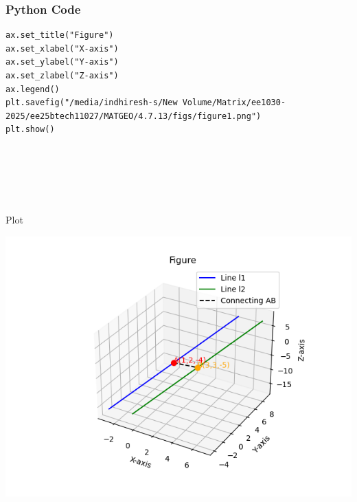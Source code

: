 \documentclass{beamer}
\begin{document}
\begin{frame}[fragile]
    \frametitle{Python Code}

    \begin{lstlisting}
ax.set_title("Figure")
ax.set_xlabel("X-axis")
ax.set_ylabel("Y-axis")
ax.set_zlabel("Z-axis")
ax.legend()
plt.savefig("/media/indhiresh-s/New Volume/Matrix/ee1030-2025/ee25btech11027/MATGEO/4.7.13/figs/figure1.png")
plt.show()






    \end{lstlisting}
\end{frame}



\begin{frame}{Plot}
    \begin{center}
        \includegraphics[width=\columnwidth, height=0.8\textheight, keepaspectratio]{figs/figure1.png}
    \end{center}
\end{frame}
\end{document}
